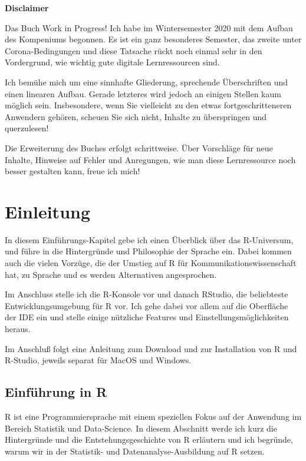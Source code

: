 \documentclass[
]{book}
\begin{document}
\textbf{Disclaimer}

Das Buch Work in Progress! Ich habe im Wintersemester 2020 mit dem Aufbau des Kompeniums begonnen. Es ist ein ganz besonderes Semester, das zweite unter Corona-Bedingungen und diese Tatsache rückt noch einmal sehr in den Vordergrund, wie wichtig gute digitale Lernressourcen sind.

Ich bemühe mich um eine sinnhafte Gliederung, sprechende Überschriften und einen linearen Aufbau. Gerade letzteres wird jedoch an einigen Stellen kaum möglich sein. Insbesondere, wenn Sie vielleicht zu den etwas fortgeschritteneren Anwendern gehören, scheuen Sie sich nicht, Inhalte zu überspringen und querzulesen!

Die Erweiterung des Buches erfolgt schrittweise. Über Vorschläge für neue Inhalte, Hinweise auf Fehler und Anregungen, wie man diese Lernressource noch besser gestalten kann, freue ich mich!

\hypertarget{intro}{%
\chapter{Einleitung}\label{intro}}

In diesem Einführungs-Kapitel gebe ich einen Überblick über das R-Universum, und führe in die Hintergründe und Philosophie der Sprache ein. Dabei kommen auch die vielen Vorzüge, die der Umstieg auf R für Kommunikationswissenschaft hat, zu Sprache und es werden Alternativen angesprochen.

Im Anschluss stelle ich die R-Konsole vor und danach RStudio, die beliebteste Entwicklungsumgebung für R vor. Ich gehe dabei vor allem auf die Oberfläche der IDE ein und stelle einige nützliche Features und Einstellungsmöglichkeiten heraus.

Im Anschluß folgt eine Anleitung zum Download und zur Installation von R und R-Studio, jeweils separat für MacOS und Windows.

\hypertarget{einfuxfchrung-in-r}{%
\section{Einführung in R}\label{einfuxfchrung-in-r}}

R ist eine Programmiersprache mit einem speziellen Fokus auf der Anwendung im Bereich Statistik und
Data-Science. In diesem Abschnitt werde ich kurz die Hintergründe und die Entstehungsgeschichte von
R erläutern und ich begründe, warum wir in der Statistik- und Datenanalyse-Ausbildung auf
R setzen.
\end{document}
